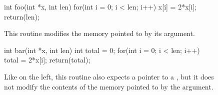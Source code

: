 \noindent
\begin{figure}[ht]
\begin{minipage}[t]{0.45\linewidth}
\centering
\begin{CCode}
int
foo(int *x, int len)
{
    for(int i = 0; i < len; i++)
	x[i] = 2*x[i];
    return(len);
}

\end{CCode}
\caption{This routine modifies the memory pointed to by its
 argument.}
\label{fig:Mutability1}
\end{minipage}
\hspace{0.5cm}
\begin{minipage}[t]{0.45\linewidth}
\centering
\begin{CCode}
int
bar(int *x, int len)
{
    int total = 0;
    for(int i = 0; i < len; i++)
	total = 2*x[i];
    return(total);
}
\end{CCode}
\caption{Like  on the left, this routine also 
expects a pointer to a , but it does not modify 
the contents of the memory pointed to by the argument.}
\label{fig:Mutability2}
\end{minipage}
\end{figure}
